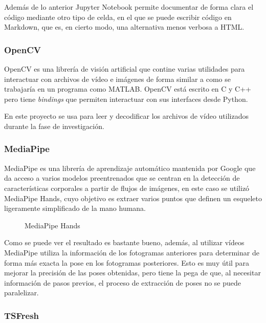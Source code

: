 Además de lo anterior Jupyter Notebook permite documentar de forma clara el
código mediante otro tipo de celda, en el que se puede escribir código en
Markdown, que es, en cierto modo, una alternativa menos verbosa a HTML.

\subsubsection{OpenCV}

OpenCV es una librería de visión artificial que contine varias utilidades para
interactuar con archivos de vídeo e imágenes de forma similar a como se
trabajaría en un programa como MATLAB\@. OpenCV está escrito en C y C++ pero tiene
\textit{bindings} que permiten interactuar con sus interfaces desde Python.

En este proyecto se usa para leer y decodificar los archivos de vídeo utilizados
durante la fase de investigación.

\subsubsection{MediaPipe}

MediaPipe es una librería de aprendizaje automático mantenida por Google que da
acceso a varios modelos preentrenados que se centran en la detección de
características corporales a partir de flujos de imágenes, en este caso se
utilizó MediaPipe Hands\cite{zhang2020mediapipe}, cuyo objetivo es extraer
varios puntos que definen un esqueleto ligeramente simplificado de la mano
humana.

\begin{figure}[H]
      \centering
      \caption{MediaPipe Hands}
\end{figure}

Como se puede ver el resultado es bastante bueno, además, al utilizar vídeos
MediaPipe utiliza la información de los fotogramas anteriores para determinar de
forma más exacta la pose en los fotogramas posteriores. Esto es muy útil para
mejorar la precisión de las poses obtenidas, pero tiene la pega de que, al
necesitar información de pasos previos, el proceso de extracción de poses no se
puede paralelizar.

\subsubsection{TSFresh}

